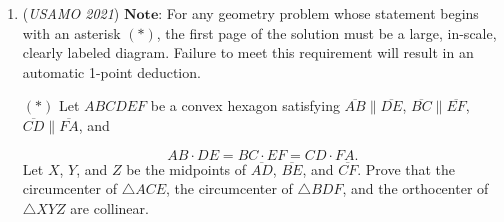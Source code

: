 \begin{enumerate}
	\item (\textit{USAMO 2021}) $\textbf{Note:}$ For any geometry problem whose statement begins with an asterisk $(*)$, the first page of the solution must be a large, in-scale, clearly labeled diagram. Failure to meet this requirement will result in an automatic 1-point deduction.


 $(*)$ Let $ABCDEF$ be a convex hexagon satisfying $\overline{AB} \parallel \overline{DE}$, $\overline{BC} \parallel \overline{EF}$, $\overline{CD} \parallel \overline{FA}$, and

 \[AB \cdot DE = BC \cdot EF = CD \cdot FA.\]
Let $X$, $Y$, and $Z$ be the midpoints of $\overline{AD}$, $\overline{BE}$, and $\overline{CF}$. Prove that the circumcenter of $\triangle ACE$, the circumcenter of $\triangle BDF$, and the orthocenter of $\triangle XYZ$ are collinear.


 

\end{enumerate}
